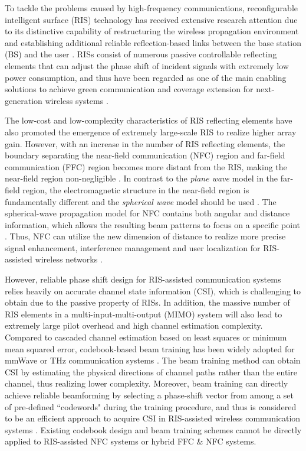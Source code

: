 \documentclass[lettersize, journal]{IEEEtran}
\begin{document}
To tackle the problems caused by high-frequency communications, reconfigurable intelligent surface (RIS) technology has received extensive research attention due to its distinctive capability of restructuring the wireless propagation environment and establishing additional reliable reflection-based links between the base station (BS) and the user {\cite{LWC.2020.2980225, JSAC.2021.3071836}}.
RISs consist of numerous passive controllable reflecting elements that can adjust the phase shift of incident signals with extremely low power consumption, and thus have been regarded as one of the main enabling solutions to achieve green communication and coverage extension for next-generation wireless systems  {\cite{JSAC.2020.3007211}}. 

The low-cost and low-complexity characteristics of RIS reflecting elements have also promoted the emergence of extremely large-scale RIS to realize higher array gain. 
However, with an increase in the number of RIS reflecting elements, the boundary separating the near-field communication (NFC) region and far-field communication (FFC) region becomes more distant from the RIS, making the near-field region non-negligible {\cite{TWC.2021.3126384, TWC.2022.3158894, TutorialReview}}.
In contrast to the {\textit{plane wave}} model in the far-field region, the electromagnetic structure in the near-field region is fundamentally different and  the {\textit{spherical wave}} model should be used {\cite{TWC.2021.3126384}}. 
The spherical-wave propagation model for NFC contains both angular and distance information, which allows the resulting beam patterns to focus on a specific point {\cite{TWC.2022.3158894}}. 
Thus, NFC can utilize the new dimension of distance to realize more precise signal enhancement, interference management and user localization for RIS-assisted wireless networks {\cite{TWC.2022.3218531, TAP.2022.3147533, LCOMM.2022.3215253, WCSP55476.2022.10039319}}. 

However, reliable phase shift design for RIS-assisted communication systems relies heavily on accurate channel state information (CSI), which is challenging to obtain due to the passive property of RISs.
In addition, the massive number of RIS elements in a multi-input-multi-output (MIMO) system will also lead to extremely large pilot overhead and high channel estimation complexity.
Compared to cascaded channel estimation based on least squares or minimum mean squared error, codebook-based beam training has been widely adopted for mmWave or THz communication systems {\cite{TCOMM.2017.2730878, TWC.2020.3019523, LWC.2022.3212344}}.
The beam training method can obtain CSI by estimating the physical directions of channel paths rather than the entire channel, thus realizing lower complexity.
Moreover, beam training can directly achieve reliable beamforming by selecting a phase-shift vector from among a set of pre-defined ``codewords" during the training procedure, and thus is considered to be an efficient approach to acquire CSI in RIS-assisted wireless communication systems {\cite{MWC.006.2100517, TCOMM.2023.3251374, TCOMM.2023.3278728}}.
Existing codebook design and beam training schemes cannot be directly applied to RIS-assisted NFC systems or hybrid FFC \& NFC systems.
\end{document}
